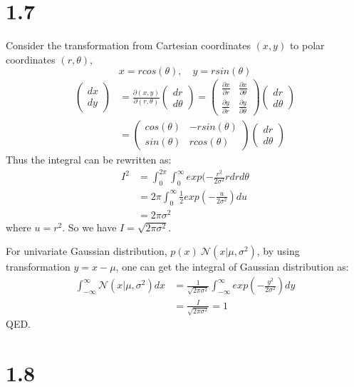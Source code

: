 \documentclass[10pt,a4paper,draft]{book}
\begin{document}
\section*{1.7}
Consider the transformation from Cartesian coordinates $(x,y)$ to polar coordinates $(r,\theta)$, 
\begin{equation}
x = r cos(\theta), \quad y = r sin(\theta)
\end{equation}
\begin{equation}
\begin{aligned}
\begin{pmatrix}
dx \\
dy
\end{pmatrix} &=
\frac{\partial(x,y)}{\partial(r,\theta)}
\begin{pmatrix}
dr \\
d\theta
\end{pmatrix} = 
\begin{pmatrix}
\frac{\partial x}{\partial r} & \frac{\partial x}{\partial \theta} \\
\frac{\partial y}{\partial r} & \frac{\partial y}{\partial \theta} 
\end{pmatrix} 
\begin{pmatrix}
dr \\
d\theta
\end{pmatrix} \\
&=
\begin{pmatrix}
cos(\theta) & -r sin(\theta) \\
sin(\theta) & r cos(\theta) 
\end{pmatrix} 
\begin{pmatrix}
dr \\
d\theta
\end{pmatrix}
\end{aligned}
\end{equation}
Thus the integral can be rewritten as:
\begin{equation}
\begin{aligned}
I^2 &=  \int_0^{2\pi} \int_0^{\infty} exp(-\frac{r^2}{2\sigma^2}r dr d\theta \\
&= 2\pi\int_0^{\infty} \frac{1}{2}exp(-\frac{u}{2\sigma^2})du \\
&= 2\pi\sigma^2
\end{aligned}
\end{equation}
where $u=r^2$. So we have $I = \sqrt{2\pi\sigma^2}$.

For univariate Gaussian distribution, $p(x) ~ \mathcal{N}(x|\mu,\sigma^2)$, by using transformation $y = x - \mu$, one can get the integral of Gaussian distribution as:
\begin{equation}
\begin{aligned}
\int_{-\infty}^{\infty}\mathcal{N}(x|\mu,\sigma^2) dx &= \frac{1}{\sqrt{2\pi\sigma^2}} \int_{-\infty}^{\infty} exp(-\frac{y^2}{2\sigma^2}) dy \\
&= \frac{I}{\sqrt{2\pi\sigma^2}} = 1
\end{aligned}
\end{equation}
QED.

\section*{1.8}
\end{document}
